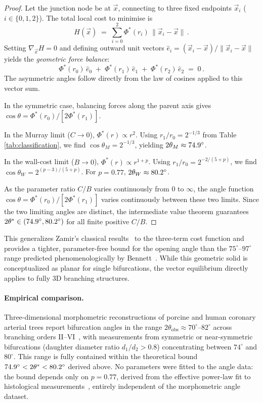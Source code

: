\documentclass[11pt,a4paper]{article}
\theoremstyle{remark}
\begin{document}
\begin{proof}
Let the junction node be at $\vec{x}$, connecting to three fixed endpoints
$\vec{x}_i$ ($i\in\{0,1,2\}$). The total local cost to minimise is
\[
  H(\vec{x}) \;=\; \sum_{i=0}^{2} \Phi^*(r_i)\,\|\vec{x}_i - \vec{x}\|\,.
\]
Setting $\nabla_{\vec{x}} H = 0$ and defining outward unit vectors
$\hat{e}_i = (\vec{x}_i - \vec{x})/\|\vec{x}_i - \vec{x}\|$
yields the \emph{geometric force balance}:
\[
  \Phi^*(r_0)\,\hat{e}_0 \;+\; \Phi^*(r_1)\,\hat{e}_1 \;+\;
  \Phi^*(r_2)\,\hat{e}_2 \;=\; 0\,.
\]
The asymmetric angles follow directly from the law of cosines applied to
this vector sum.

In the symmetric case, balancing forces along the parent axis gives $\cos\theta
= \Phi^*(r_0)/[2\Phi^*(r_1)]$.

In the Murray limit ($C\to0$), $\Phi^*(r) \propto r^2$. Using $r_1/r_0 =
2^{-1/3}$ from Table \ref{tab:classification}, we find $\cos\theta_M =
2^{-1/3}$, yielding $2\theta_M \approx 74.9^\circ$.

In the wall-cost limit ($B\to0$), $\Phi^*(r) \propto r^{1+p}$. Using $r_1/r_0 =
2^{-2/(5+p)}$, we find $\cos\theta_W = 2^{(p-3)/(5+p)}$. For $p=0.77$,
$2\theta_W \approx 80.2^\circ$.

As the parameter ratio $C/B$ varies continuously from $0$ to $\infty$, the angle
function $\cos\theta = \Phi^*(r_0)/[2\Phi^*(r_1)]$ varies continuously between
these two limits. Since the two limiting angles are distinct, the intermediate
value theorem guarantees
$2\theta^*\in(74.9^\circ,80.2^\circ)$ for all finite
positive $C/B$.
\end{proof}

This generalizes Zamir's classical results~\cite{Zamir1978} to the three-term
cost function and provides a tighter, parameter-free bound for the opening angle
than the $75^\circ$--$97^\circ$ range predicted phenomenologically by
Bennett~\cite{bennett2025}. While this geometric solid is conceptualized as
planar for single bifurcations, the vector equilibrium directly applies to fully
3D branching structures.

\paragraph{Empirical comparison.} Three-dimensional morphometric reconstructions
of porcine and human coronary arterial trees report bifurcation angles in the
range $2\theta_{\mathrm{obs}} \approx 70^\circ$--$82^\circ$ across branching
orders II--VI~\cite{Zamir1982,Kaimovitz2005}, with measurements from symmetric
or near-symmetric bifurcations (daughter diameter ratio $d_1/d_2 > 0.8$)
concentrating between $74^\circ$ and $80^\circ$. This range is fully contained
within the theoretical bound $74.9^\circ < 2\theta^* <
80.2^\circ$ derived above. No parameters were fitted to the angle
data: the bound depends only on $p = 0.77$, derived from the effective power-law fit to histological
measurements~\cite{Guo2003}, entirely independent of the
morphometric angle dataset.
\end{document}
